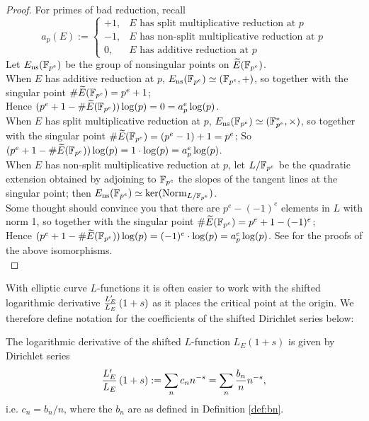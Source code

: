 \begin{proof}
For primes of bad reduction, recall
\begin{equation}
a_p(E) := \begin{cases}
+1, & \text{$E$ has split multiplicative reduction at $p$} \\
-1, & \text{$E$ has non-split multiplicative reduction at $p$} \\
0, & \text{$E$ has additive reduction at $p$}
\end{cases}
\end{equation}
Let $E_{\text{ns}}(\mathbb{F}_{p^e})$ be the group of nonsingular points on $\widetilde{E}(\mathbb{F}_{p^e})$. \\
When $E$ has additive reduction at $p$, $E_{\text{ns}}(\mathbb{F}_{p^e}) \simeq (\mathbb{F}_{p^e},+)$, so together with the singular point $\#\widetilde{E}(\mathbb{F}_{p^e}) = p^e+1$; \\
Hence $(p^e + 1 - \#\widetilde{E}(\mathbb{F}_{p^e}))\log(p) = 0 = a_p^e \log(p)$. \\
When $E$ has split multiplicative reduction at $p$, $E_{\text{ns}}(\mathbb{F}_{p^e}) \simeq (\mathbb{F}_{p^e}^*,\times)$, so together with the singular point $\#\widetilde{E}(\mathbb{F}_{p^e}) = (p^e-1)+1 = p^e$; So $(p^e + 1 - \#\widetilde{E}(\mathbb{F}_{p^e}))\log(p) = 1\cdot \log(p) = a_p^e \log(p)$. \\
When $E$ has non-split multiplicative reduction at $p$, let $L/\mathbb{F}_{p^e}$ be the quadratic extension obtained by adjoining to $\mathbb{F}_{p^e}$ the slopes of the tangent lines  at the singular point; then $E_{\text{ns}}(\mathbb{F}_{p^e}) \simeq \ker(\operatorname{Norm}_{L/\mathbb{F}_{p^e}})$. \\
Some thought should convince you that there are $p^e-(-1)^e$ elements in $L$ with norm 1, so together with the singular point $\#\widetilde{E}(\mathbb{F}_{p^e}) = p^e+1-(-1)^e$; \\
Hence $(p^e + 1 - \#\widetilde{E}(\mathbb{F}_{p^e}))\log(p) = (-1)^e\cdot \log(p) = a_p^e \log(p)$.
See \cite[pg. 180, Prop. 5.1]{Sil-1985} for the proofs of the above isomorphisms.\\
\end{proof}

With elliptic curve $L$-functions it is often easier to work with the shifted logarithmic derivative $\frac{L_E^{\prime}}{L_E}\left(1+s\right)$ as it places the critical point at the origin. We therefore define notation for the coefficients of the shifted Dirichlet series below:
\begin{definition}\label{def:cn}
The logarithmic derivative of the shifted $L$-function $L_E(1+s)$ is given by Dirichlet series
\begin{equation}
\frac{L_E^{\prime}}{L_E}\left(1+s\right) := \sum_n c_n n^{-s} = \sum_{n} \frac{b_n}{n} n^{-s},
\end{equation}
i.e. $c_n = b_n/n$, where the $b_n$ are as defined in Definition \ref{def:bn}.
\end{definition}

